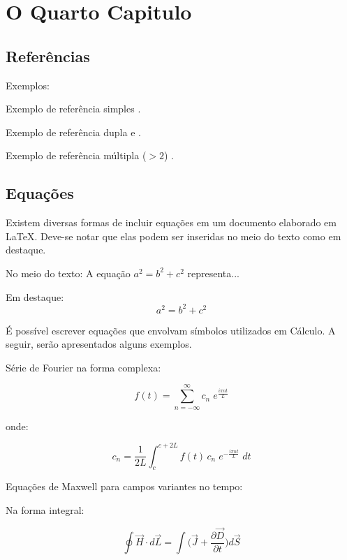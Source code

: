\chapter{O Quarto Capitulo}


\section{Referências}

Exemplos:

Exemplo de referência simples \cite{ctan}.

Exemplo de referência dupla \cite{ctan} e \cite{signal}.

Exemplo de referência múltipla ($> 2$) \cite{signal}.

\section{Equações}

Existem diversas formas de incluir equações em um documento elaborado em \LaTeX.
Deve-se notar que elas podem ser inseridas no meio do texto como em destaque.

No meio do texto: A equação $a^{2}=b^{2}+c^{2}$ representa...

Em destaque: \[ a^{2}=b^{2}+c^{2} \]

É possível escrever equações que envolvam símbolos utilizados em Cálculo.
A seguir, serão apresentados alguns exemplos.

Série de Fourier na forma complexa:

\begin{equation}
	f(t) = \sum_{n=-\infty}^{\infty} c_{n} \; e^{\frac{i \pi n t}{L}}
\end{equation}

onde:

\begin{equation}
	c_{n} = \frac{1}{2L} \int_{c}^{c+2L} f(t) \, c_{n} \; e^{-\frac{i \pi n t}{L}} \; dt
\end{equation}

\vspace{5mm}

Equações de Maxwell para campos variantes no tempo:

Na forma integral:

\begin{equation}
	\oint \vec{H} \cdot d\vec{L} = \int \Bigg( \vec{J}+\frac{\partial \vec{D}}{\partial t} \Bigg) d\vec{S} 
\end{equation}

